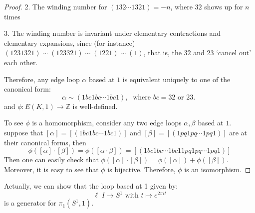 \begin{proof}
2. The winding number for \(\left( {1{32}\cdots {132}1}\right)  =  - n\), where $32$ shows up for \(n\) times

3. The winding number is invariant under elementary contractions and elementary expansions, since (for instance) $(1231321) \sim (123321) \sim (1221) \sim (1)$, that is, the $32$ and $23$ `cancel out' each other.

Therefore, any edge loop \(\alpha\) based at $1$ is equivalent uniquely to one of the canonical form:
\[
\alpha  \sim  \left( {{1bc1bc}\cdots {1bc1}}\right),\;\text{ where }{bc} = {32}\text{ or 23. }
\]
and $\phi: E(K,1) \to \mathbb{Z}$ is well-defined.

To see $\phi$ is a homomorphism, consider any two edge loops \(\alpha,\beta\) based at $1$. suppose that \(\left\lbrack  \alpha \right\rbrack   = \left\lbrack  \left( {{1bc1bc}\cdots {1bc1}}\right) \right\rbrack\) and \(\left\lbrack  \beta \right\rbrack   = \left\lbrack  \left( {{1pq1pq}\cdots {1pq1}}\right) \right\rbrack\) are at their canonical forms, then
\[
\phi \left( {\left\lbrack  \alpha \right\rbrack   \cdot  \left\lbrack  \beta \right\rbrack  }\right)  = \phi \left( \left\lbrack  {\alpha  \cdot  \beta }\right\rbrack  \right)  = \left\lbrack  \left( {{1bc1bc}\cdots {1bc11pq1pq}\cdots {1pq1}}\right) \right\rbrack
\]
Then one can easily check that
$\phi \left( {\left\lbrack  \alpha \right\rbrack   \cdot  \left\lbrack  \beta \right\rbrack  }\right) = \phi \left( {\left\lbrack  \alpha \right\rbrack  }\right) + \phi \left(  \left\lbrack  \beta \right\rbrack  \right)$.
Moreover, it is easy to see that $\phi$ is bijective. 
Therefore, \(\phi\) is an isomorphism.
\end{proof}

Actually, we can show that the loop based at 1 given by:
\[
\ell \;I \rightarrow  {S}^{1}
\text{ with }t \mapsto  {e}^{2\pi it}
\]
is a generator for \({\pi }_{1}\left( {{S}^{1},1}\right)\).



